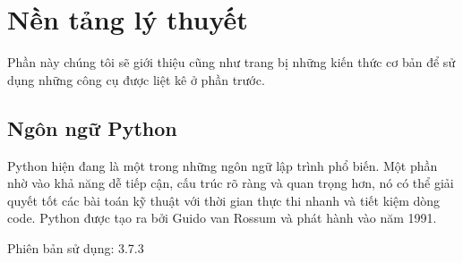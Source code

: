 \chapter{Nền tảng lý thuyết}
Phần này chúng tôi sẽ giới thiệu cũng như trang bị những kiến thức cơ bản để sử dụng những công cụ được liệt kê ở phần trước.
\section{Ngôn ngữ Python}
Python hiện đang là một trong những ngôn ngữ lập trình phổ biến. Một phần nhờ vào khả năng dễ tiếp cận, cấu trúc rõ ràng và quan trọng hơn, nó có thể giải quyết tốt các bài toán kỹ thuật với thời gian thực thi nhanh và tiết kiệm dòng code. Python được tạo ra bởi Guido van Rossum và phát hành vào năm 1991\cite{python}.
\par
Phiên bản sử dụng: 3.7.3
